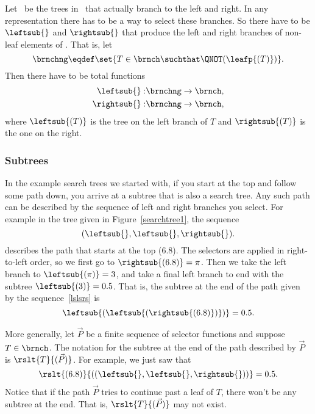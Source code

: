 \begin{definition}
\iffalse
 We define the
\term{leaves} to be elements that $\leafp{}$ picks out:
\[
\leafset \eqdef \set{T \in \brnch \suchthat \leafp{(T)}}.
\]

So the official definition of ``leaf'' is ``element of the set \leafset.''
\fi

Let \brnchng\ be the trees in \brnch\ that actually branch to the left
and right.  In any representation there has to be a way to select
these branches.  So there have to be 
$\leftsub{}$ and $\rightsub{}$ that produce the left and right
branches of non-leaf elements of \brnch.  That is, let
\[
\brnchng \eqdef \set{T \in \brnch \suchthat \QNOT(\leafp{(T)})}.
\]
Then there have to be total functions
\begin{align*}
\leftsub{}: & \brnchng \to \brnch,\\
\rightsub{}:& \brnchng \to \brnch,
\end{align*}
where $\leftsub{(T)}$ is the tree on the left branch of $T$ and
$\rightsub{(T)}$ is the one on the right.

\subsubsection{Subtrees}

In the example search trees we started with, if you start at the top
and follow some path down, you arrive at a subtree that is also a
search tree.  Any such path can be described by the sequence of left
and right branches you select.  For example in the tree given in
Figure~\ref{searchtree1}, the sequence
\begin{equation}\label{lslsrs}
(\leftsub{},\leftsub{},\rightsub{}).
\end{equation}
describes the path that starts at the top (6.8).  The selectors are
applied in right-to-left order, so we first go to $\rightsub{(6.8)} =
\pi$.  Then we take the left branch to $\leftsub{(\pi)} = 3$, and take a
final left branch to end with the subtree $\leftsub{(3)} = 0.5$.  That
is, the subtree at the end of the path given by the sequence~\eqref{lslsrs} is
\[
\leftsub{(\leftsub{(\rightsub{(6.8)})})} = 0.5.
\]

More generally, let $\vec{P}$ be a finite sequence of selector
functions and suppose $T \in \brnch$.  The notation for the subtree at
the end of the path described by $\vec{P}$ is $\rslt{T}{(\vec{P})}$.
For example, we just saw that
\[
\rslt{(6.8)}{((\leftsub{},\leftsub{},\rightsub{}))} = 0.5.
\]
Notice that if the path $\vec{P}$ tries to continue past a leaf of
$T$, there won't be any subtree at the end.  That is,
$\rslt{T}{(\vec{P})}$ may not exist.


\end{definition}
